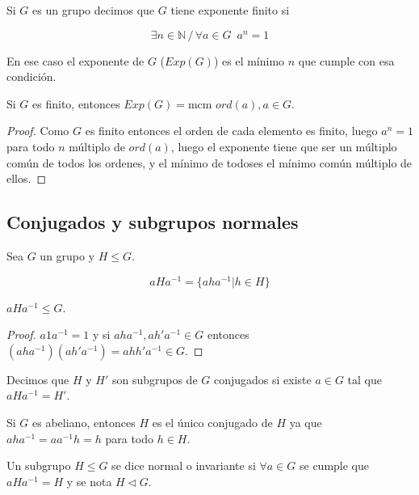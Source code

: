\begin{defn}
Si $G$ es un grupo decimos que $G$ tiene exponente finito si 

$$\exists n \in \mathbb{N} \,/\, \forall a \in G \,\, \, a^n = 1$$

En ese caso el exponente de $G$ ($Exp(G)$) es el m\'inimo $n$ que cumple con esa condici\'on.
\end{defn}

\begin{prop}
Si $G$ es finito, entonces $Exp(G) = \displaystyle \textrm{mcm } ord(a), a \in G$.
\end{prop}

\begin{proof}
Como $G$ es finito entonces el orden de cada elemento es finito, luego $a^n = 1$ para todo $n$ m\'ultiplo de $ord(a)$, luego el exponente tiene que ser un m\'ultiplo com\'un de todos los ordenes, y el m\'inimo de todoses el m\'inimo com\'un m\'ultiplo de ellos.
\end{proof}

\subsection{Conjugados y subgrupos normales}

\begin{defn}
Sea $G$ un grupo y $H \leq G$.

$$aHa^{-1} = \{aha^{-1} | h \in H\}$$
\end{defn}

\begin{obs}
$aHa^{-1} \leq G$.
\end{obs}

\begin{proof}
$a1a^{-1} = 1$ y si $aha^{-1}, ah'a^{-1} \in G$ entonces $(aha^{-1})(ah'a^{-1}) = ahh'a^{-1} \in G$.
\end{proof}

Decimos que $H$ y $H'$ son subgrupos de $G$ conjugados si existe $a \in G$ tal que $aHa^{-1} = H'$.

\begin{obs}
Si $G$ es abeliano, entonces $H$ es el \'unico conjugado de $H$ ya que $aha^{-1} = aa^{-1}h = h$ para todo $h \in H$.   
\end{obs}

\begin{defn}
Un subgrupo $H \leq G$ se dice normal o invariante si $\forall a \in G$ se cumple que $aHa^{-1} = H$ y se nota $H \triangleleft G$.
\end{defn}

